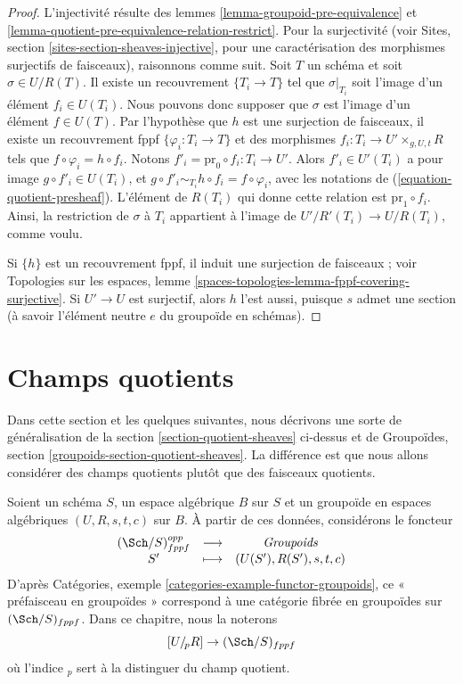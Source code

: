\begin{proof}
L'injectivité résulte des lemmes \ref{lemma-groupoid-pre-equivalence} et \ref{lemma-quotient-pre-equivalence-relation-restrict}. Pour la surjectivité (voir Sites, section \ref{sites-section-sheaves-injective}, pour une caractérisation des morphismes surjectifs de faisceaux), raisonnons comme suit. Soit $T$ un schéma et soit $\sigma \in U/R(T)$. Il existe un recouvrement $\{T_i \to T\}$ tel que $\sigma|_{T_i}$ soit l'image d'un élément $f_i \in U(T_i)$. Nous pouvons donc supposer que $\sigma$ est l'image d'un élément $f \in U(T)$. Par l'hypothèse que $h$ est une surjection de faisceaux, il existe un recouvrement fppf $\{\varphi_i : T_i \to T\}$ et des morphismes $f_i : T_i \to U' \times_{g, U, t} R$ tels que $f \circ \varphi_i = h \circ f_i$. Notons $f'_i = \text{pr}_0 \circ f_i : T_i \to U'$. Alors $f'_i \in U'(T_i)$ a pour image $g \circ f'_i \in U(T_i)$, et $g \circ f'_i \sim_{T_i} h \circ f_i = f \circ \varphi_i$, avec les notations de (\ref{equation-quotient-presheaf}). L'élément de $R(T_i)$ qui donne cette relation est $\text{pr}_1 \circ f_i$. Ainsi, la restriction de $\sigma$ à $T_i$ appartient à l'image de $U'/R'(T_i) \to U/R(T_i)$, comme voulu.

\medskip\noindent
Si $\{h\}$ est un recouvrement fppf, il induit une surjection de faisceaux ; voir Topologies sur les espaces, lemme \ref{spaces-topologies-lemma-fppf-covering-surjective}. Si $U' \to U$ est surjectif, alors $h$ l'est aussi, puisque $s$ admet une section (à savoir l'élément neutre $e$ du groupoïde en schémas).
\end{proof}





\section{Champs quotients}
\label{section-stacks}

\noindent
Dans cette section et les quelques suivantes, nous décrivons une sorte de généralisation de la section \ref{section-quotient-sheaves} ci-dessus et de Groupoïdes, section \ref{groupoids-section-quotient-sheaves}. La différence est que nous allons considérer des champs quotients plutôt que des faisceaux quotients.

\medskip\noindent
Soient un schéma $S$, un espace algébrique $B$ sur $S$ et un groupoïde en espaces algébriques $(U, R, s, t, c)$ sur $B$. À partir de ces données, considérons le foncteur
\begin{equation}
\label{equation-quotient-stack}
\begin{matrix}
(\Sch/S)_{fppf}^{opp} &
\longrightarrow &
\textit{Groupoids} \\
S' &
\longmapsto &
(U(S'), R(S'), s, t, c)
\end{matrix}
\end{equation}
D'après Catégories, exemple \ref{categories-example-functor-groupoids}, ce « préfaisceau en groupoïdes » correspond à une catégorie fibrée en groupoïdes sur $(\Sch/S)_{fppf}$. Dans ce chapitre, nous la noterons
$$
[U/_{\!p}R] \to (\Sch/S)_{fppf}
$$
où l'indice ${}_p$ sert à la distinguer du champ quotient.

